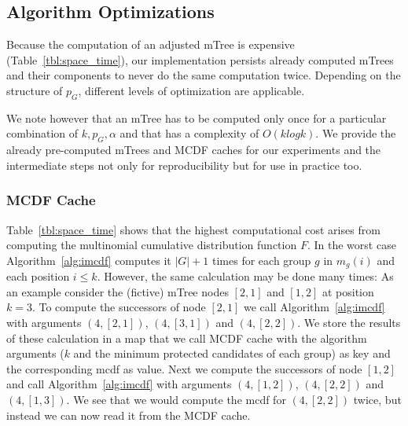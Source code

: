 %
%

\subsection{Algorithm Optimizations}
Because the computation of an adjusted mTree is expensive (Table~\ref{tbl:space_time}), our implementation persists already computed mTrees and their components to never do the same computation twice. 
%
Depending on the structure of $p_G$, different levels of optimization are applicable.

We note however that an mTree has to be computed only once for a particular combination of $k, p_G, \alpha$ and that \algoFAIR has a complexity of $O(k log k)$.
%
We provide the already pre-computed mTrees and MCDF caches for our experiments and the intermediate steps not only for reproducibility but for use in practice too.

\subsubsection{MCDF Cache}\label{subsubsec:mcdf-cache}
Table~\ref{tbl:space_time} shows that the highest computational cost arises from computing the multinomial cumulative distribution function $F$. 
%
In the worst case Algorithm~\ref{alg:imcdf} computes it $|G|+1$ times for each group $g$ in $m_g(i)$ and each position $i\leq k$.
%
However, the same calculation may be done many times:
%
As an example consider the (fictive) mTree nodes $[2,1]$ and $[1,2]$ at position $k=3$. 
%
To compute the successors of node $[2,1]$ we call Algorithm~\ref{alg:imcdf} with arguments $(4,[2,1])$, $(4,[3,1])$ and $(4,[2,2])$. 
%
We store the results of these calculation in a map that we call MCDF cache with the algorithm arguments ($k$ and the minimum protected candidates of each group) as key and the corresponding mcdf as value.
%
Next we compute the successors of node $[1,2]$ and call Algorithm~\ref{alg:imcdf} with arguments $(4,[1,2])$, $(4,[2,2])$ and $(4,[1,3])$. 
%
We see that we would compute the mcdf for $(4,[2,2])$ twice, but instead we can now read it from the MCDF cache.

